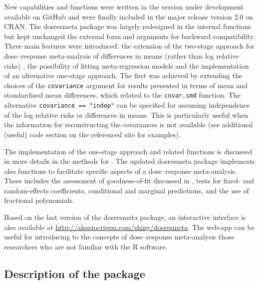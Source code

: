 \documentclass[11pt,a4paper,twoside,openany]{book}\usepackage{knitr}
\newcommand{\pkg}[1]{{\fontseries{b}\selectfont #1}}
\begin{document}
{\noindent New capabilities and functions were written in the version under development available on GitHub and were finally included in the major release version 2.0 on CRAN. The \pkg{dosresmeta} package was largely redesigned in the internal functions but kept unchanged the external form and arguments for backward compatibility. Three main features were introduced: the extension of the two-stage approach for dose--response meta-analysis of differences in means (rather than log relative risks) \citep{crippa2016dose}, the  possibility of fitting meta-regression models and the implementation of an alternative one-stage approach. The first was achieved by extending the choices of the \texttt{covariance} argument for results presented in terms of mean and standardized mean differences, which related to the \texttt{covar.smd} function. The alternative \texttt{covariance == "indep"} can be specified for assuming independence of the log relative risks or differences in means. This is particularly useful when the information for reconstructing the covariances is not available (see additional (useful) code section on the referenced site for examples).

\noindent The implementation of the one-stage approach and related functions is discussed in more details in the methods for . 
The updated \pkg{dosresmeta} package implements also functions to facilitate specific aspects of a dose--response meta-analysis. These includes the assessment of goodness-of-fit discussed in , tests for fixed- and random-effects coefficients, conditional and marginal predictions, and the use of fractional polynomials.

Based on the last version of the \pkg{dosresmeta} package, an interactive interface is also available at \url{http://alessiocrippa.com/shiny/dosresmeta}. The web-app can be useful for introducing to the concepts of dose--response meta-analysis those researchers who are not familiar with the \textsf{R} software.

\subsection{Description of the package}

}
\end{document}
